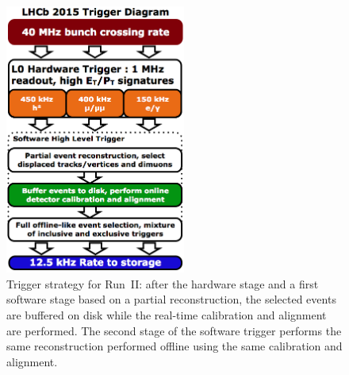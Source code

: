 \begin{figure}[h]
\includegraphics[width=14pc]{../figures/trigger.png}\hspace{2pc}%
\begin{minipage}[b]{14pc}\caption{\label{fig:trigger}Trigger strategy for Run~II: after the hardware stage and a first software stage based on a partial
    reconstruction, the selected events are buffered on disk while the
    real-time calibration and alignment are performed. The second
    stage of the software trigger performs the same reconstruction
    performed offline using the same calibration and alignment.}
\end{minipage}
\end{figure}



